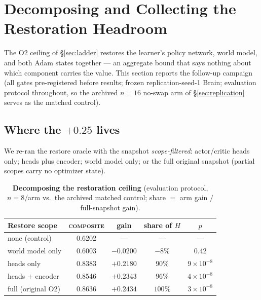 \documentclass[11pt]{article}
\newcommand{\composite}{\textsc{composite}}
\begin{document}
\section{Decomposing and Collecting the Restoration Headroom}
\label{sec:memory}

The O2 ceiling of \S\ref{sec:ladder} restores the learner's policy network,
world model, and both Adam states together --- an aggregate bound that says
nothing about which component carries the value. This section reports the
follow-up campaign (all gates pre-registered before results; frozen
replication-seed-1 Brain; evaluation protocol throughout, so the archived
$n{=}16$ no-swap arm of \S\ref{sec:replication} serves as the matched
control).

\subsection{Where the $+0.25$ lives}
\label{sec:decomp}

We re-ran the restore oracle with the snapshot \emph{scope-filtered}:
actor/critic heads only; heads plus encoder; world model only; or the full
original snapshot (partial scopes carry no optimizer state).

\begin{table}[t]
  \centering
  \caption{\textbf{Decomposing the restoration ceiling} (evaluation protocol,
  $n{=}8$/arm vs.\ the archived matched control; share $=$ arm gain $/$
  full-snapshot gain).}
  \label{tab:decomp}
  \small
  \begin{tabular}{lcccc}
    \toprule
    Restore scope & \composite{} & gain & share of $H$ & $p$ \\
    \midrule
    none (control)        & 0.6202 & ---       & ---     & --- \\
    world model only      & 0.6003 & $-0.0200$ & $-8\%$  & 0.42 \\
    heads only            & 0.8383 & $+0.2180$ & $90\%$  & $9\times10^{-8}$ \\
    heads $+$ encoder     & 0.8546 & $+0.2343$ & $96\%$  & $4\times10^{-8}$ \\
    full (original O2)    & 0.8636 & $+0.2434$ & $100\%$ & $3\times10^{-8}$ \\
    \bottomrule
  \end{tabular}
\end{table}
\end{document}
